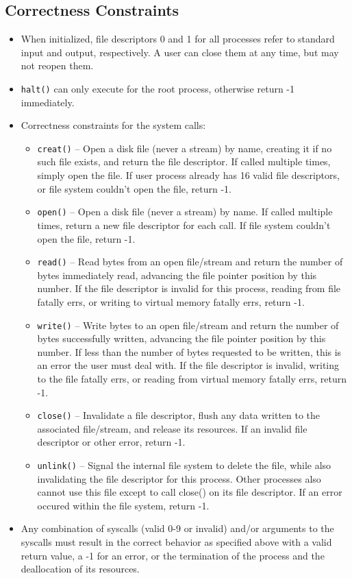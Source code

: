 \subsection{Correctness Constraints}
\begin{itemize}
\item When initialized, file descriptors 0 and 1 for all processes refer to standard input and output, respectively. A user can close them at any time, but may not reopen them.
\item \texttt{halt()} can only execute for the root process, otherwise return -1 immediately.
\item Correctness constraints for the system calls:
\begin{itemize}
\item \texttt{creat()} -- Open a disk file (never a stream) by name, creating it if no such file exists, and return the file descriptor. If called multiple times, simply open the file. If user process already has 16 valid file descriptors, or file system couldn't open the file, return -1.
\item \texttt{open()} -- Open a disk file (never a stream) by name. If called multiple times, return a new file descriptor for each call. If file system couldn't open the file, return -1.
\item \texttt{read()} -- Read bytes from an open file/stream and return the number of bytes immediately read, advancing the file pointer position by this number. If the file descriptor is invalid for this process, reading from file fatally errs, or writing to virtual memory fatally errs, return -1. 
\item \texttt{write()} -- Write bytes to an open file/stream and return the number of bytes successfully written, advancing the file pointer position by this number. If less than the number of bytes requested to be written, this is an error the user must deal with. If the file descriptor is invalid, writing to the file fatally errs, or reading from virtual memory fatally errs, return -1.
\item \texttt{close()} -- Invalidate a file descriptor, flush any data written to the associated file/stream, and release its resources. If an invalid file descriptor or other error, return -1.
\item \texttt{unlink()} -- Signal the internal file system to delete the file, while also invalidating the file descriptor for this process. Other processes also cannot use this file except to call close() on its file descriptor. If an error occured within the file system, return -1.
\end{itemize}
\item Any combination of syscalls (valid 0-9 or invalid) and/or arguments to the syscalls must result in the correct behavior as specified above with a valid return value, a -1 for an error, or the termination of the process and the deallocation of its resources.
\end{itemize}
